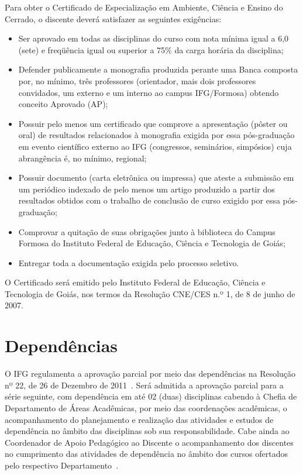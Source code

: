 \documentclass[11pt,fleqn]{book} %
\begin{document}
Para obter o Certificado de Especialização em Ambiente, Ciência e Ensino do Cerrado, o discente deverá satisfazer as seguintes exigências:
\begin{itemize}
	\item Ser aprovado em todas as disciplinas do curso com nota mínima igual a 6,0 (sete) e freqüência igual ou superior a 75\% da carga horária da disciplina;
	\item Defender publicamente a monografia produzida perante uma Banca composta por, no mínimo, três professores (orientador, mais dois professores convidados, um externo e um interno ao campus IFG/Formosa) obtendo conceito Aprovado (AP);
	\item Possuir pelo menos um certificado que comprove a apresentação (pôster ou oral) de resultados relacionados à monografia exigida por essa pós-graduação em evento científico externo ao IFG (congressos, seminários, simpósios) cuja abrangência é, no mínimo, regional;
	\item Possuir documento (carta eletrônica ou impressa) que ateste a submissão em um periódico indexado de pelo menos um artigo produzido a partir dos resultados obtidos com o trabalho de conclusão de curso exigido por essa pós-graduação;
	\item Comprovar a quitação de suas obrigações junto à biblioteca do Campus Formosa do Instituto Federal de Educação, Ciência e Tecnologia de Goiás;
	\item Entregar toda a documentação exigida pelo processo seletivo.
\end{itemize}

O Certificado será emitido pelo Instituto Federal de Educação, Ciência e Tecnologia de Goiás, nos termos da Resolução CNE/CES n.º 1, de 8 de junho de 2007.	


\section{Dependências}
\indent

O IFG regulamenta a aprovação parcial por meio das dependências na Resolução nº 22, de 26 de Dezembro de 2011~\cite{Resolucao22De2011}.
Será admitida a aprovação parcial para a série seguinte, com dependência em até 02 (duas) disciplinas cabendo à Chefia de Departamento de Áreas Acadêmicas, por meio das coordenações acadêmicas, o acompanhamento do planejamento e realização das atividades e estudos de dependência no âmbito das disciplinas sob sua responsabilidade.
Cabe ainda ao Coordenador de Apoio Pedagógico ao Discente o acompanhamento dos discentes no cumprimento das atividades de dependência no âmbito dos cursos ofertados pelo respectivo Departamento~\cite{Resolucao22De2011}.
\end{document}
